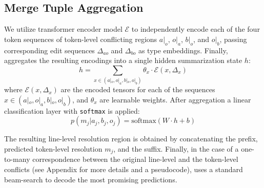 \subsection{Merge Tuple Aggregation}

We utilize transformer encoder model $\mathcal{E}$ to independently encode each of the four token sequences of token-level conflicting regions $a|_{o}$, $o|_{a}$, $b|_{o}$, and $o|_{b}$, passing corresponding edit sequences $\Delta_{ao}$ and $\Delta_{bo}$ as type embeddings. Finally, \thistool{} aggregates the resulting encodings into a single hidden summarization state $h$:
\begin{dmath}
h = \sum_{x \in (a|_{o}, o|_{a}, b|_{o}, o|_{b})} \theta_{x} \cdot \mathcal{E} (x, \Delta_x)
\end{dmath}
where $\mathcal{E} (x, \Delta_x)$ are the encoded tensors for each of the sequences $x \in (a|_{o}, o|_{a}, b|_{o}, o|_{b})$, and $\theta_{x}$ are learnable weights. After aggregation a linear classification layer with \texttt{softmax} is applied:
\begin{equation}
      p(m_{j} | a_{j}, b_{j}, o_{j}) = \mathrm{softmax}(W\cdot h + b)
\end{equation}

The resulting line-level resolution region is obtained by concatenating the prefix, predicted token-level resolution $m_{j}$, and the suffix. Finally, in the case of a one-to-many correspondence between the original line-level and the token-level conflicts (see Appendix for more details and a pseudocode), \thistool{} uses a standard beam-search to decode the most promising predictions. 





